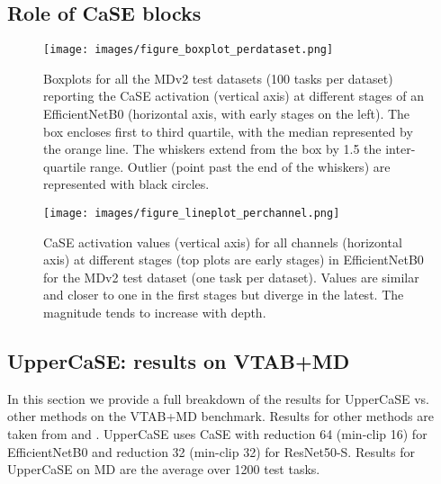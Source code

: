 \documentclass{article}
\begin{document}
\clearpage
\subsection{Role of CaSE blocks} \label{appendix:ssec_case_role_case_blocks}

\begin{figure}[H]
  \centering
  \texttt{[image: images/figure\_boxplot\_perdataset.png]}
  \caption{Boxplots for all the MDv2 test datasets (100 tasks per dataset) reporting the CaSE activation (vertical axis) at different stages of an EfficientNetB0 (horizontal axis, with early stages on the left). The box encloses first to third quartile, with the median represented by the orange line. The whiskers extend from the box by 1.5 the inter-quartile range. Outlier (point past the end of the whiskers) are represented with black circles.}
  \label{fig:appendix_boxplot_perdataset}
\end{figure}

\begin{figure}[H]
  \centering
  \texttt{[image: images/figure\_lineplot\_perchannel.png]}
  \caption{CaSE activation values (vertical axis) for all channels (horizontal axis) at different stages (top plots are early stages) in EfficientNetB0 for the MDv2 test dataset (one task per dataset). Values are similar and closer to one in the first stages but diverge in the latest. The magnitude tends to increase with depth.}
  \label{fig_gammas_per_layer}
\end{figure}



\clearpage

\subsection{UpperCaSE: results on VTAB+MD} \label{appendix:ssec_uppercsae_results_vtab_md}

In this section we provide a full breakdown of the results for UpperCaSE vs. other methods on the VTAB+MD benchmark. Results for other methods are taken from \cite{bronskill2021memory} and \cite{dumoulin2021comparing}. UpperCaSE uses CaSE with reduction 64 (min-clip 16) for EfficientNetB0 and reduction 32 (min-clip 32) for ResNet50-S. Results for UpperCaSE on MD are the average over 1200 test tasks. 
\end{document}

